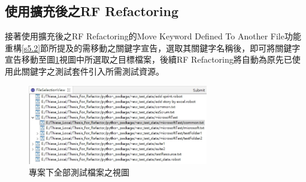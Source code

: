 
\subsection{使用擴充後之RF Refactoring}
\indent
接著使用擴充後之RF Refactoring的Move Keyword Defined To Another File功能重構\ref{s5.2}節所提及的需移動之關鍵字宣告，選取其關鍵字名稱後，即可將關鍵字宣告移動至圖\ref{f5.12}視圖中所選取之目標檔案，後續RF Refactoring將自動為原先已使用此關鍵字之測試套件引入所需測試資源。

\begin{figure}[H]
    \centering
    \includegraphics[width=0.7\textwidth]{picture/ch5/Eclipse_choose_file_in_case2.png}
    \caption{專案下全部測試檔案之視圖}
    \label{f5.12}
\end{figure}


